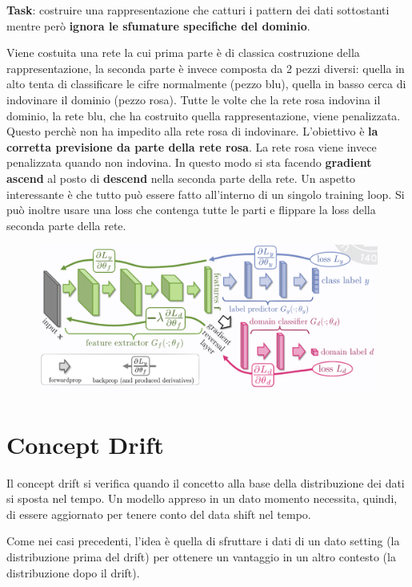 \textbf{Task}: costruire una rappresentazione che catturi i pattern dei dati sottostanti mentre però
\textbf{ignora le sfumature specifiche del dominio}.

Viene costuita una rete la cui prima parte è di classica costruzione della rappresentazione, la seconda parte 
è invece composta da 2 pezzi diversi: quella in alto tenta di classificare le cifre normalmente (pezzo blu),
quella in basso cerca di indovinare il dominio (pezzo rosa). Tutte le volte che la rete rosa indovina 
il dominio, la rete blu, che ha costruito quella rappresentazione, viene penalizzata. Questo perchè non ha 
impedito alla rete rosa di indovinare. L'obiettivo è \textbf{la corretta previsione da parte della rete rosa}. 
La rete rosa viene invece penalizzata quando non indovina. In questo modo si sta facendo \textbf{gradient
ascend} al posto di \textbf{descend} nella seconda parte della rete. Un aspetto interessante è che tutto può
essere fatto all'interno di un singolo training loop. Si può inoltre usare una loss che contenga tutte 
le parti e flippare la loss della seconda parte della rete. 
\begin{figure}[!h]
  \includegraphics[scale=.3]{images/representation_learning/dom_ad_ex01.png}
  \centering
\end{figure}
\newpage

\section{Concept Drift}
Il concept drift si verifica quando il concetto alla base della distribuzione dei dati si sposta nel tempo. 
Un modello appreso in un dato momento necessita, quindi, di essere aggiornato per tenere conto del data shift
nel tempo. 


Come nei casi precedenti, l'idea è quella di sfruttare i dati di un dato setting (la distribuzione prima 
del drift) per ottenere un vantaggio in un altro contesto (la distribuzione dopo il drift).


